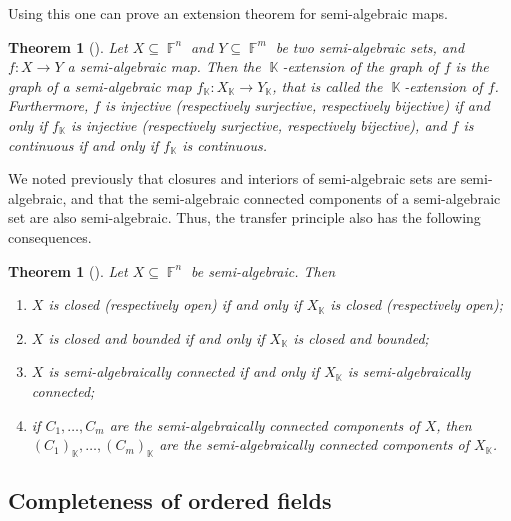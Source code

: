 \documentclass{amsart}
\theoremstyle{plain}
\newtheorem{theorem}[proposition]{Theorem}
\theoremstyle{definition}
\DeclareMathOperator{\Fb}{{\mathbb{F}}}
\DeclareMathOperator{\Kb}{\mathbb{K}}
\newcommand*\from{\colon}
\newcommand{\1}{\mathbf{1}}
\begin{document}
Using this one can prove an extension theorem for semi-algebraic maps.

\begin{theorem}[{\cite[Propositions 5.3.1, 5.3.3, 5.3.5]{BochnakCosteRoy_RealAlgebraicGeometry}}]
\label{thm_ExtSemiAlgMaps}
Let $X \subseteq \Fb^n$ and $Y \subseteq \Fb^m$ be two semi-algebraic sets, and $f \from X \to Y$ a semi-algebraic map.
Then the $\Kb$-extension of the graph of $f$ is the graph of a semi-algebraic map $f_{\Kb} \from X_{\Kb} \to Y_{\Kb}$, that is called the \emph{$\Kb$-extension} of $f$.
Furthermore, $f$ is injective (respectively surjective, respectively bijective) if and only if $f_{\Kb}$ is injective (respectively surjective, respectively bijective), and $f$ is continuous if and only if $f_{\Kb}$ is continuous.
\end{theorem}

We noted previously that closures and interiors of semi-algebraic sets are semi-algebraic, and that the semi-algebraic connected components of a semi-algebraic set are also semi-algebraic. Thus, the transfer principle also has the following consequences.


\begin{theorem}[{\cite[Propositions 5.3.5 and 5.3.6]{BochnakCosteRoy_RealAlgebraicGeometry}}] \label{thm_ExtConnComp}
    Let $X \subseteq \Fb^n$ be semi-algebraic. Then 
    \begin{enumerate}
        \item 
        \label{thm_ExtConnComp: closedness}
        $X$ is closed (respectively open) if and only if $X_{\Kb}$ is closed (respectively open);
        \item 
        \label{thm_ExtConnComp: closed and bounded}
        $X$ is closed and bounded if and only if $X_{\Kb}$ is closed and bounded;
        \item $X$ is semi-algebraically connected if and only if $X_{\Kb}$ is semi-algebraically connected;
        \item if $C_1, \ldots, C_m$ are the semi-algebraically connected components of $X$, then $(C_1)_{\Kb}, \ldots, (C_m)_{\Kb}$ are the semi-algebraically connected components of $X_{\Kb}$.
    \end{enumerate}
\end{theorem}

\subsection{Completeness of ordered fields}\label{subsection:CompletenessOrderedFields}
\end{document}
